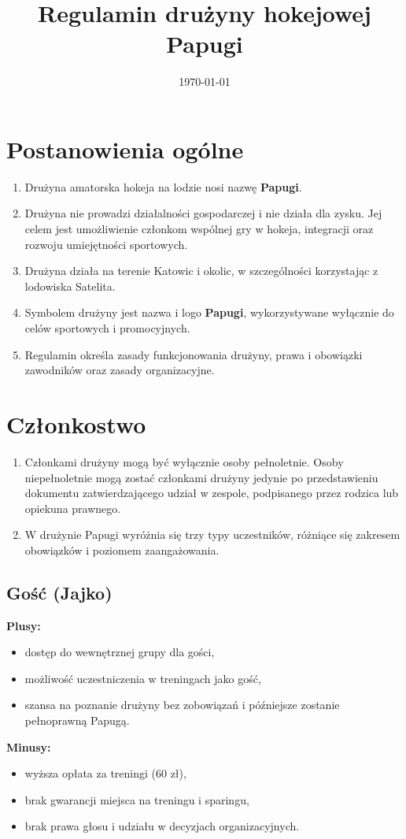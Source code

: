 \documentclass[12pt,a4paper]{article}
\title{Regulamin drużyny hokejowej Papugi}
\date{\today}
\let\stdsection\section
\renewcommand\section{\clearpage\stdsection}
\begin{document}
\maketitle
\tableofcontents

\section{Postanowienia ogólne}
\begin{enumerate}
  \item Drużyna amatorska hokeja na lodzie nosi nazwę \textbf{Papugi}.
  \item Drużyna nie prowadzi działalności gospodarczej i nie działa dla zysku. Jej celem jest umożliwienie członkom wspólnej gry w hokeja, integracji oraz rozwoju umiejętności sportowych.
  \item Drużyna działa na terenie Katowic i okolic, w szczególności korzystając z lodowiska Satelita.
  \item Symbolem drużyny jest nazwa i logo \textbf{Papugi}, wykorzystywane wyłącznie do celów sportowych i promocyjnych.
  \item Regulamin określa zasady funkcjonowania drużyny, prawa i obowiązki zawodników oraz zasady organizacyjne.
\end{enumerate}

\section{Członkostwo}
\begin{enumerate}
  \item Członkami drużyny mogą być wyłącznie osoby pełnoletnie. Osoby niepełnoletnie mogą zostać członkami drużyny jedynie po przedstawieniu dokumentu zatwierdzającego udział w zespole, podpisanego przez rodzica lub opiekuna prawnego.
  \item W drużynie Papugi wyróżnia się trzy typy uczestników, różniące się zakresem obowiązków i poziomem zaangażowania.
\end{enumerate}

\subsection{Gość (Jajko)}
\textbf{Plusy:}
\begin{itemize}
    \item dostęp do wewnętrznej grupy dla gości,
    \item możliwość uczestniczenia w treningach jako gość,
    \item szansa na poznanie drużyny bez zobowiązań i późniejsze zostanie pełnoprawną Papugą.
\end{itemize}
\textbf{Minusy:}
\begin{itemize}
    \item wyższa opłata za treningi (60 zł),
    \item brak gwarancji miejsca na treningu i sparingu,
    \item brak prawa głosu i udziału w decyzjach organizacyjnych.
\end{itemize}
\end{document}

